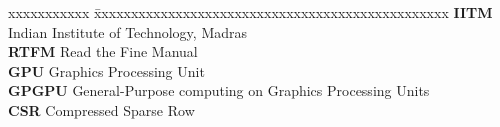 \documentclass[MTech]{iitmdiss}
\begin{document}
\pagebreak


\begin{singlespace}
\tableofcontents
\thispagestyle{empty}

\listoftables
{}
\listoffigures
{}
\end{singlespace}


\abbreviations

\noindent 
\begin{tabbing}
xxxxxxxxxxx \= xxxxxxxxxxxxxxxxxxxxxxxxxxxxxxxxxxxxxxxxxxxxxxxx \kill
\textbf{IITM}   \> Indian Institute of Technology, Madras \\
\textbf{RTFM} \> Read the Fine Manual \\
\textbf{GPU} \> Graphics Processing Unit \\
\textbf{GPGPU} \> General-Purpose computing on Graphics Processing Units  \\
\textbf{CSR} \> Compressed Sparse Row \\

\end{tabbing}

\pagebreak


%
%
\clearpage

\end{document}
